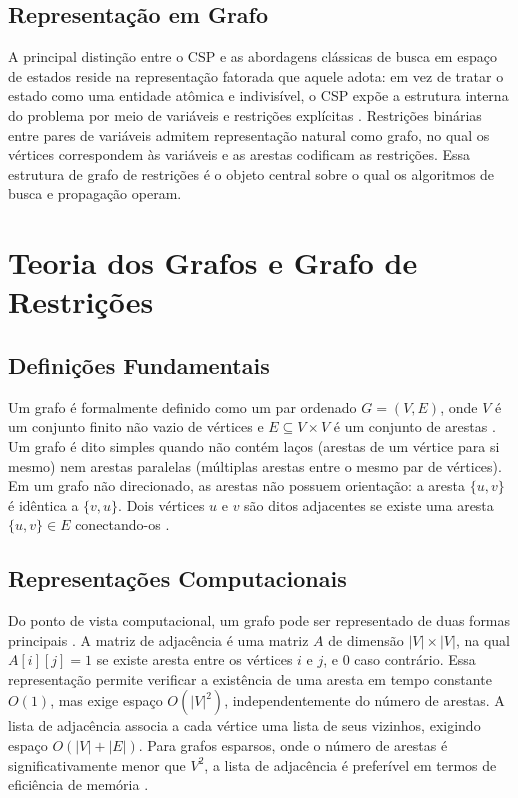 \subsection{Representação em Grafo}
A principal distinção entre o CSP e as abordagens clássicas de busca em espaço
de estados reside na representação fatorada que aquele adota: em vez de tratar o
estado como uma entidade atômica e indivisível, o CSP expõe a estrutura interna
do problema por meio de variáveis e restrições explícitas \cite{Russell2010,Kumar1992}.
Restrições binárias entre pares de variáveis admitem representação natural como grafo,
no qual os vértices correspondem às variáveis e as arestas codificam as restrições.
Essa estrutura de grafo de restrições é o objeto central sobre o qual os algoritmos de busca e propagação
operam.

\section{Teoria dos Grafos e Grafo de Restrições}
\label{sec:grafo-restricoes}

\subsection{Definições Fundamentais}
Um grafo é formalmente definido como um par ordenado $G = (V, E)$,
onde $V$ é um conjunto finito não vazio de vértices e $E \subseteq V \times V$
é um conjunto de arestas \cite{Diestel2017}.
Um grafo é dito simples quando não contém laços (arestas de um vértice para si mesmo)
nem arestas paralelas (múltiplas arestas entre o mesmo par de vértices).
Em um grafo não direcionado, as arestas não possuem orientação:
a aresta $\{u, v\}$ é idêntica a $\{v, u\}$. Dois vértices $u$ e $v$ são ditos
adjacentes se existe uma aresta $\{u, v\} \in E$ conectando-os \cite{Diestel2017}.

\subsection{Representações Computacionais}
Do ponto de vista computacional, um grafo pode ser representado de duas formas
principais \cite{Cormen2001}. A matriz de adjacência é uma matriz $A$ de dimensão $|V| \times |V|$, na qual $A[i][j] = 1$
se existe aresta entre os vértices $i$ e $j$, e $0$ caso contrário. Essa representação permite
verificar a existência de uma aresta em tempo constante $O(1)$, mas exige espaço $O(|V|^2)$,
independentemente do número de arestas. A lista de adjacência associa a cada
vértice uma lista de seus vizinhos, exigindo espaço $O(|V| + |E|)$.
Para grafos esparsos, onde o número de arestas é significativamente menor que
$V^2$, a lista de adjacência é preferível em termos de eficiência de memória \cite{Cormen2001}.

